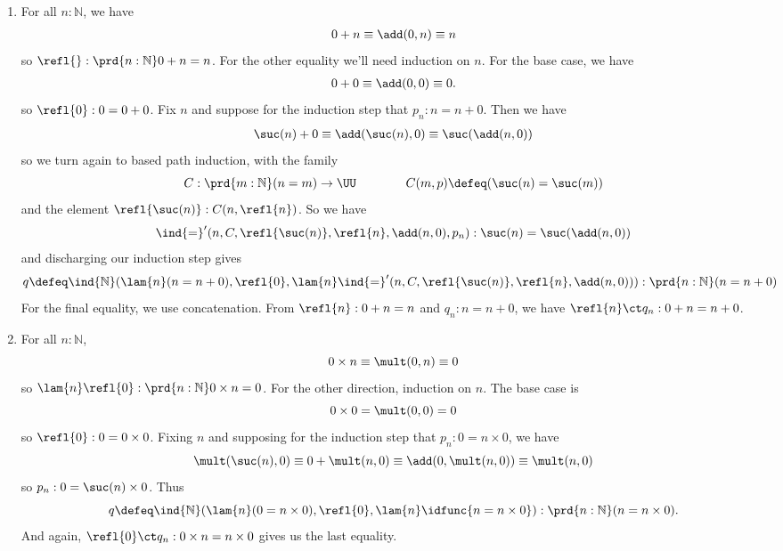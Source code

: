\begin{enumerate}
\item For all $n : \mathbb{N}$, we have
\begin{align*}
0 + n \equiv \add(0, n) \equiv n
\end{align*}
so $\refl{}:\prd{n:\mathbb{N}}0+n = n$.  For the other equality
we'll need induction on $n$.  For the base case, we have
\begin{align*}
0 + 0 \equiv \add(0, 0) \equiv 0.
\end{align*}
so $\refl{0} : 0 = 0 + 0$.
Fix $n$ and suppose for the induction step that $p_{n} : n = n+0$.  Then we have
\begin{align*}
\suc(n) + 0 \equiv \add(\suc(n), 0) \equiv \suc(\add(n, 0))  
\end{align*}
so we turn again to based path induction, with the family
\[
C : \prd{m:\mathbb{N}}(n = m) \to \UU
\qquad\qquad
C(m, p) \defeq (\suc(n) = \suc(m))
\]
and the element $\refl{\suc(n)} : C(n, \refl{n})$.  So we have
\[
\ind{=}'(n, C, \refl{\suc(n)}, \refl{n}, \add(n, 0), p_{n}) 
: 
\suc(n) = \suc(\add(n, 0))
\]
and discharging our induction step gives
\[
q \defeq \ind{\mathbb{N}}(\lam{n}(n = n+0), \refl{0}, 
\lam{n}\ind{=}'(n, C, \refl{\suc(n)}, \refl{n}, \add(n, 0))
)
:
\prd{n:\mathbb{N}} (n = n+0)
\]
For the final equality, we use concatenation.  From $\refl{n} : 0 + n = n$ and
$q_{n} : n = n + 0$, we have $\refl{n} \ct q_{n} : 0 + n = n + 0$.

\item For all $n : \mathbb{N}$,
\[
0 \times n \equiv \mult(0, n) \equiv 0
\]
so $\lam{n}\refl{0} : \prd{n:\mathbb{N}}0 \times n = 0$.  For the other
direction, induction on $n$.  The base case is
\[
0 \times 0 = \mult(0, 0) = 0
\]
so $\refl{0} : 0 = 0 \times 0$.  Fixing $n$ and supposing for the induction step that $p_{n} :
0 = n \times 0$, we have
\[
\mult(\suc(n), 0) \equiv 0 + \mult(n, 0) \equiv \add(0, \mult(n, 0)) \equiv
\mult(n, 0)
\]
so $p_{n} : 0 = \suc(n) \times 0$.  Thus
\[
q 
\defeq \ind{\mathbb{N}}(\lam{n}(0 = n \times 0), \refl{0}, \lam{n}\idfunc{n = n \times 0}) 
: \prd{n : \mathbb{N}} (n = n \times 0).
\]
And again, $\refl{0} \ct q_{n} : 0 \times n = n \times 0$ gives us the last
equality.


\end{enumerate}

